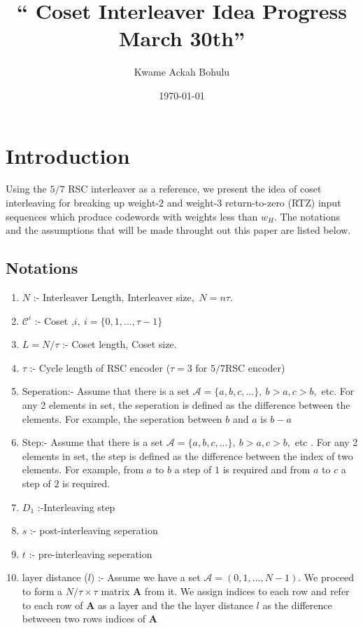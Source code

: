 \documentclass[11pt, oneside, dvipdfmx]{book}
\title{``
Coset Interleaver Idea Progress March 30th'' }
\author{Kwame Ackah Bohulu}
\date{\today}
\begin{document}
\maketitle




\section{Introduction}
Using the $5/7$ RSC interleaver as a reference, we present the idea of coset interleaving for breaking up weight-$2$ and weight-$3$ return-to-zero (RTZ) input sequences which produce codewords with weights less than $w_H$. The notations and the assumptions that will be made throught out this paper are listed below.


 \subsection{Notations}
 \begin{enumerate}
 \item $N$ :- Interleaver Length, Interleaver size,~$N=n\tau$.
  \item $\mathcal{C}^i$ :- Coset ,$i,~i=\{0,1,...,\tau-1 \}$
 \item $L=N/\tau$ :- Coset length, Coset size.
 \item $\tau$ :- Cycle length of RSC encoder ($\tau= 3$ for $5/7$RSC encoder)
 \item Seperation:- Assume that there is a set $\mathcal{A}=\{a,b,c,...\},~b>a,c>b,$ etc. For any 2 elements in set, the seperation is defined as the difference between the elements. For example, the seperation between $b$ and $a$ is $b-a$
 \item Step:- Assume that there is a set $\mathcal{A}=\{a,b,c,...\},~b>a,c>b,$ etc . For any 2 elements in set, the step is defined as the difference between the index of two elements. For example, from $a$ to $b$ a step of $1$ is required and from $a$ to $c$ a step of $2$ is required.
 \item $D_1$ :-Interleaving step
 \item $s$ :- post-interleaving seperation
 \item $t$ :- pre-interleaving seperation
 \item layer distance ($l$) :- Assume we have a set $\mathcal{A}=(0,1,...,N-1)$. We proceed to form a $N/\tau \times \tau$ matrix $\mathbf{A}$ from it. We assign indices to each row and refer to each row of $\mathbf{A}$ as a layer and the the layer distance $l$ as the difference betweeen two rows indices of $\mathbf{A}$
 

 \end{enumerate}
 
\end{document}
